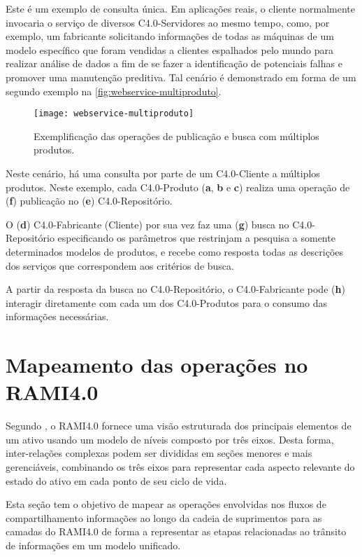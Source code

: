Este é um exemplo de consulta única. Em aplicações reais, o cliente normalmente invocaria o serviço de diversos C4.0-Servidores ao mesmo tempo, como, por exemplo, um fabricante solicitando informações de todas as máquinas de um modelo específico que foram vendidas a clientes espalhados pelo mundo para realizar análise de dados a fim de se fazer a identificação de potenciais falhas e promover uma manutenção preditiva. Tal cenário é demonstrado em forma de um segundo exemplo na \autoref{fig:webservice-multiproduto}.

\begin{figure}[htb]
	\centering
	\texttt{[image: webservice-multiproduto]}
	\caption{Exemplificação das operações de publicação e busca com múltiplos produtos.}
	\label{fig:webservice-multiproduto}
\end{figure}

Neste cenário, há uma consulta por parte de um C4.0-Cliente a múltiplos produtos. Neste exemplo, cada C4.0-Produto (\textbf{a}, \textbf{b} e \textbf{c}) realiza uma operação de (\textbf{f}) publicação no (\textbf{e}) C4.0-Repositório.

O (\textbf{d}) C4.0-Fabricante (Cliente) por sua vez faz uma (\textbf{g}) busca no C4.0-Repositório especificando os parâmetros que restrinjam a pesquisa a somente determinados modelos de produtos, e recebe como resposta todas as descrições dos serviços que correspondem aos critérios de busca.

A partir da resposta da busca no C4.0-Repositório, o C4.0-Fabricante pode (\textbf{h}) interagir diretamente com cada um dos C4.0-Produtos para o consumo das informações necessárias.

\section{Mapeamento das operações no RAMI4.0}

Segundo , o RAMI4.0 fornece uma visão estruturada dos principais elementos de um ativo usando um modelo de níveis composto por três eixos. Desta forma, inter-relações complexas podem ser divididas em seções menores e mais gerenciáveis, combinando os três eixos para representar cada aspecto relevante do estado do ativo em cada ponto de seu ciclo de vida.

Esta seção tem o objetivo de mapear as operações envolvidas nos fluxos de compartilhamento informações ao longo da cadeia de suprimentos para as camadas do RAMI4.0 de forma a representar as etapas relacionadas ao trânsito de informações em um modelo unificado.

